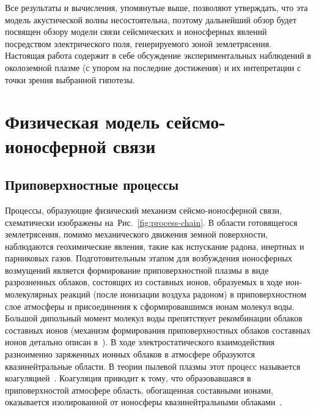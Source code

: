 \documentclass[12pt, oneside, a4paper]{article}
\begin{document}
Все результаты и вычисления, упомянутые выше, позволяют утверждать, что эта модель акустической волны несостоятельна, поэтому дальнейший обзор будет посвящен обзору модели связи сейсмических и ионосферных явлений посредством электрического поля, генерируемого зоной землетрясения. Настоящая работа содержит в себе обсуждение экспериментальных наблюдений в околоземной плазме (с упором на последние достижения) и их интепретации с точки зрения выбранной гипотезы.

\section{Физическая модель сейсмо-ионосферной связи}
\subsection{Приповерхностные процессы}
Процессы, образующие физический механизм сейсмо-ионосферной связи, схематически изображены на~\mbox{Рис. \ref{fig:process-chain}}. В области готовящегося землетрясения, помимо механического движения земной поверхности, наблюдаются геохимические явления, такие как испускание радона, инертных и парниковых газов. Подготовительным этапом для возбуждения ионосферных возмущений является формирование приповерхностной плазмы в виде разрозненных облаков, состоящих из составных ионов, образуемых в ходе ион-молекулярных реакций (после ионизации воздуха радоном) в приповерхностном слое атмосферы и присоединения к сформировавшимся ионам молекул воды. Большой дипольный момент молекул воды препятствует рекомбинации облаков составных ионов (механизм формирования приповерхностных облаков составных ионов детально описан в~\cite{Pulinets_Boyarchuk:2004}). В ходе электростатического взаимодействия разноименно заряженных ионных облаков в атмосфере образуются квазинейтральные области. В теории пылевой плазмы этот процесс называется коагуляцией~\cite{Horanyi_Goertz:1990}. Коагуляция приводит к тому, что образовавшаяся в приповерхностой атмосфере область, обогащенная составными ионами, оказывается изолированной от ионосферы квазинейтральными облаками~\cite{Pulinets:2002a}.
\end{document}
